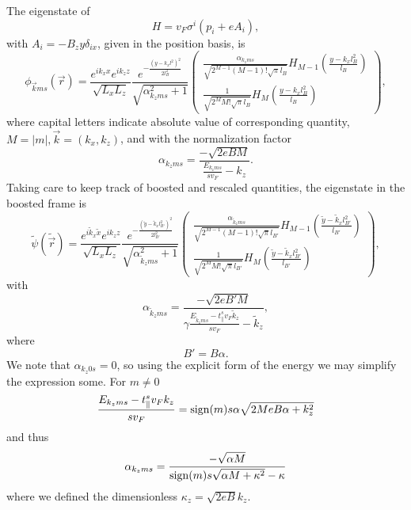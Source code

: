 The eigenstate of
\[
H = v_{F} \sigma ^{i} ( p_{i} + e A_{i} ),
\]
with \(A_{i} = - B_{z} y \delta _{i x}\), given in the position basis, is
\begin{equation}
  \phi _{\vec{k} m s}(\vec{r}) =  \frac{e^{ik_x x}e^{ik_z z}}{\sqrt{L_xL_z}}
  \frac{e^{-\frac{(y-k_x l^2)^2}{2 l_B^2}}}{\sqrt{\alpha_{k_z m s}^2 + 1}}
  \begin{pmatrix}
    \frac{\alpha_{k_z m s}}{\sqrt{2^{M-1} (M-1)! \sqrt{\pi } l_B}} H_{M-1}\left( \frac{y-k_x l_B^2}{l_B} \right)\\
    \frac{1}{\sqrt{2^M M! \sqrt{\pi } l_B}} H_M \left( \frac{y-k_x l_B^2}{l_B} \right)
  \end{pmatrix},
\end{equation}
where capital letters indicate absolute value of corresponding quantity, $M=|m|, \vec{k} = (k_x, k_z)$, and with the normalization factor
\begin{equation}
  \alpha_{k_z m s} = \frac{-\sqrt{2eB M}}{\frac{E_{k_z m s}}{s v_{F}} -   k_z}.
\end{equation}
Taking care to keep track of boosted and rescaled quantities, the eigenstate in the boosted frame is
\begin{equation}
  \label{eq:47}
  \tilde{\psi}(\tilde{\vec{r}}) =
  \frac{e^{i \tilde{k}_x \tilde{x}}e^{i k_z z}}{\sqrt{L_xL_z}}
  \frac{e^{-\frac{\left(\tilde{y} - \tilde{k}_x l_{B'}^2\right)^2}{2 l_{B'}^2}}}{\sqrt{\alpha_{\tilde{k}_z m s}^2 + 1}}
  \begin{pmatrix}
    \frac{\alpha_{\tilde{k}_z m s}}{\sqrt{2^{M-1} (M-1)! \sqrt{\pi } l_{B'}}} H_{M-1}\left( \frac{\tilde{y} - \tilde{k}_x l_{B'}^2}{l_{B'}} \right)\\
    \frac{1}{\sqrt{2^M M! \sqrt{\pi } l_{B'}}} H_M \left( \frac{\tilde{y} - \tilde{k}_x l_{B'}^2}{l_{B'}} \right)
  \end{pmatrix},
\end{equation}
with
\begin{equation}
  \alpha_{\tilde{k}_z m s} = \frac{-\sqrt{2e B'  M}}{ \gamma \frac{E_{\tilde{k}_z m s} - t^s_{\parallel} v_{F} \tilde{k}_{z}}{s v_{F}} -   \tilde{k}_z},
\end{equation}
where
\[
B' = B \alpha.
\]
We note that \( \alpha_{k_z 0 s} = 0 \), so using the explicit form of the energy we may simplify the expression some.
For \( m\neq 0 \)
\[
  \frac{
    E_{k_z m s} - t^s_{\parallel} v_F k_z
  }{s v_{F}} = \operatorname{sign}(m) s \alpha \sqrt{2 M e B \alpha + k_{z}^2}
\]
and thus
\begin{equation}
  \label{eq:48}
  \alpha_{k_z m s} =
  \frac{-\sqrt{ \alpha M }}{\operatorname{sign}(m) s \sqrt{\alpha M + \kappa^2} - \kappa}
\end{equation}
where we defined the dimensionless \( \kappa_z = \sqrt{2 e B} k_z  \).

